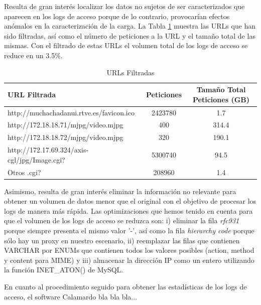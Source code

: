 \documentclass[twocolumn]{Jornadas}
\begin{document}
Resulta de gran interés localizar los datos no sujetos de ser caracterizados que aparecen en los logs de acceso porque de lo contrario, provocarían efectos anómalos en la caracterización de la carga.
La Tabla \ref{table:url} muestra las URLs que han sido filtradas, así como el número de peticiones a la URL y el tamaño total de las mismas.
Con el filtrado de estas URLs el volumen total de los logs de acceso se reduce en un 3.5\%.

\begin{table}[ht!]
\centering
\renewcommand{\baselinestretch}{1.5}
\scriptsize
\begin{tabular}{|l||c|c|} \hline
URL Filtrada                                  & Peticiones & Tamaño Total Peticiones (GB) \\\hline\hline
http://muchachadanui.rtve.es/favicon.ico      & 2423780    & 1.7                          \\\hline  
http://172.18.18.71/mjpg/video.mjpg           & 400        & 314.4                        \\\hline 
http://172.18.18.72/mjpg/video.mjpg           & 320        & 190.1                        \\\hline 
http://172.17.69.324/axis-cgl/jpg/Image.cgi?  & 5300740    & 94.5                         \\\hline 
Otros .cgi?                                   & 208960     & 1.4                          \\\hline 
\end{tabular}
\caption{URLs Filtradas}
\label{table:url}
\end{table}

Asimismo, resulta de gran interés eliminar la información no relevante para obtener un volumen de datos menor que el original con el objetivo de procesar los logs de manera más rápida. Las optimizaciones que hemos tenido en cuenta para que el volumen de los logs de acceso se reduzca son: i) eliminar la fila \emph{rfc931} porque siempre presenta el mismo valor '-', así como la fila \emph{hierarchy code} porque sólo hay un proxy en nuestro escenario, ii) reemplazar las filas que contienen VARCHAR por ENUMs que contienen todos los valores posibles (action, method y content para MIME) y iii) almacenar la dirección IP como un entero utilizando la función INET\_ATON() de MySQL.

En cuanto al procedimiento seguido para obtener las estadísticas de los logs de acceso, el software Calamardo bla bla bla...
\end{document}
